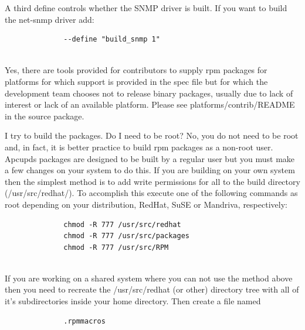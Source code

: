 {{{{{{{{{\begin{description}
\begin{verbatim}
\end{verbatim}
\normalsize

   A third define controls whether the SNMP driver is built. If you want to build the net-snmp driver add:

\footnotesize
\begin{verbatim}
              --define "build_snmp 1"
     
\end{verbatim}
\normalsize


\item [{\bf Can I supply packages for other platforms you do not publish?}]
   Yes, there are tools provided for contributors to supply rpm packages for platforms 
for which support is provided in the spec file but for which the development team 
chooses not to release binary packages, usually due to lack of interest or lack of an 
available platform. Please see platforms/contrib/README in the source package.  

\item [{\bf I'm getting errors about not having permission when}]
   I try to build the packages.  Do I need to be root? No, you do not need to be
root and, in fact, it is better practice to build rpm packages as a non-root
user.  Apcupds packages are designed to be built by a regular user but you
must make a few changes on your system to do this.  If you are building on
your own system then the simplest method is to add write permissions for all
to the build directory (/usr/src/redhat/).  To accomplish this execute one of the
following commands as root depending on your distribution, RedHat, SuSE or 
Mandriva, respectively:  

\footnotesize
\begin{verbatim}
              chmod -R 777 /usr/src/redhat
              chmod -R 777 /usr/src/packages
              chmod -R 777 /usr/src/RPM
     
\end{verbatim}
\normalsize

If you are working on a shared system where you can not use the method above
then you need to recreate the /usr/src/redhat (or other) directory tree with all 
of it's subdirectories inside your home directory. Then create a file named  

\footnotesize
\begin{verbatim}
              .rpmmacros
     

\end{verbatim}
\end{description}}}}}}}}}}
